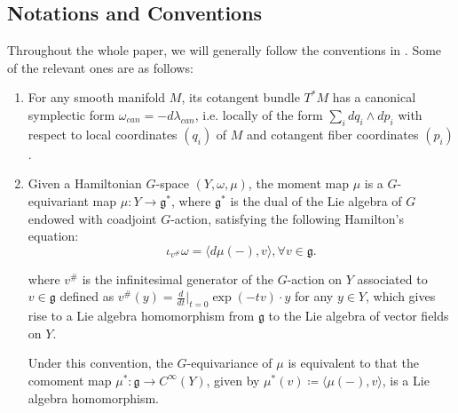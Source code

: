 \documentclass{amsart}
\numberwithin{equation}{section}
\newcommand{\Ad}{\mathrm{Ad}}
\begin{document}
\subsection*{Notations and Conventions}
Throughout the whole paper, we will generally follow the conventions in \cite{CFM}. Some of the relevant ones are as follows:
\begin{enumerate}
\item For any smooth manifold $M$, its cotangent bundle $T^*M$ has a canonical symplectic form $\omega_{can} = -d\lambda_{can}$, i.e. locally of the form $\sum_{i} dq_i \wedge dp_i$ with respect to local coordinates $(q_i)$ of $M$ and cotangent fiber coordinates $(p_i)$.


\item Given a Hamiltonian $G$-space $(Y, \omega, \mu)$, the moment map $\mu$ is a $G$-equivariant map $\mu: Y \rightarrow \mathfrak{g}^*$, where $\mathfrak{g}^*$ is the dual of the Lie algebra of $G$ endowed with coadjoint $G$-action, satisfying the following Hamilton's equation:
\begin{equation}\label{hamilton}
  \iota_{v^\#}\omega = \langle d\mu(-), v \rangle, \forall v\in \mathfrak{g}.
\end{equation}

where $v^\#$ is the infinitesimal generator of the $G$-action on $Y$ associated to $v\in \mathfrak{g}$ defined as $v^\#(y) = \frac{d}{dt}|_{t=0} \exp(-tv)\cdot y$ for any $y\in Y$, which gives rise to a Lie algebra homomorphism from $\mathfrak{g}$ to the Lie algebra of vector fields on $Y$.

Under this convention, the $G$-equivariance of $\mu$ is equivalent to that the comoment map $\mu^*: \mathfrak{g} \rightarrow C^\infty(Y)$, given by $\mu^*(v) \coloneqq \langle \mu(-), v\rangle$, is a Lie algebra homomorphism.




\end{enumerate}
\end{document}
